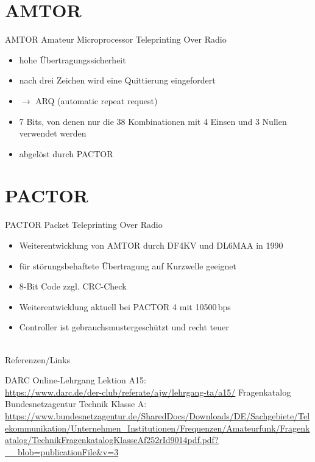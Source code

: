 \section{AMTOR}
\begin{frame}{AMTOR}
  Amateur Microprocessor Teleprinting Over Radio
  \begin{itemize}
    \item hohe Übertragungssicherheit
    \item nach drei Zeichen wird eine Quittierung eingefordert
    \item $\rightarrow$ ARQ (automatic repeat request)
    \item 7 Bits, von denen nur die 38 Kombinationen mit 4 Einsen und 3 Nullen verwendet werden
    \item abgelöst durch PACTOR
  \end{itemize}
\end{frame}

\section{PACTOR}
\begin{frame}{PACTOR}
  Packet Teleprinting Over Radio
  \begin{itemize}
    \item Weiterentwicklung von AMTOR durch DF4KV und DL6MAA in 1990
    \item für störungsbehaftete Übertragung auf Kurzwelle geeignet
    \item 8-Bit Code zzgl. CRC-Check
    \item Weiterentwicklung aktuell bei PACTOR 4 mit 10500\,bps
    \item Controller ist gebrauchsmustergeschützt und recht teuer
  \end{itemize}
\end{frame}


\renewcommand{\refname}{Referenzen}

\hypertarget{refs}{}
\textcolor{white}{} \\ %
\Large Referenzen/Links
\footnotesize

\begin{thebibliography}{}
    DARC Online-Lehrgang Lektion A15:\\
    \url{https://www.darc.de/der-club/referate/ajw/lehrgang-ta/a15/}
     Fragenkatalog Bundesnetzagentur Technik Klasse A:\\
    \url{https://www.bundesnetzagentur.de/SharedDocs/Downloads/DE/Sachgebiete/Telekommunikation/Unternehmen_Institutionen/Frequenzen/Amateurfunk/Fragenkatalog/TechnikFragenkatalogKlasseAf252rId9014pdf.pdf?__blob=publicationFile&v=3}
\end{thebibliography}


